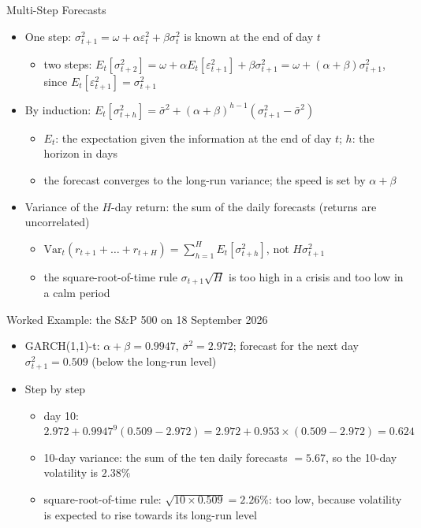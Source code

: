 \begin{frame}{Multi-Step Forecasts}
\itemsize{\small}
\begin{itemize}
    \item One step: $\sigma_{t+1}^2 = \omega + \alpha\varepsilon_t^2 + \beta\sigma_t^2$ is known at the end of day $t$
    \begin{itemize}
        \item two steps: $E_t[\sigma_{t+2}^2] = \omega + \alpha E_t[\varepsilon_{t+1}^2] + \beta\sigma_{t+1}^2 = \omega + (\alpha + \beta)\sigma_{t+1}^2$, since $E_t[\varepsilon_{t+1}^2] = \sigma_{t+1}^2$
    \end{itemize}
    \item By induction: $E_t[\sigma_{t+h}^2] = \bar\sigma^2 + (\alpha + \beta)^{h-1}(\sigma_{t+1}^2 - \bar\sigma^2)$
    \begin{itemize}
        \item $E_t$: the expectation given the information at the end of day $t$; $h$: the horizon in days
        \item the forecast converges to the long-run variance; the speed is set by $\alpha + \beta$
    \end{itemize}
    \item Variance of the $H$-day return: the sum of the daily forecasts (returns are uncorrelated)
    \begin{itemize}
        \item $\mathrm{Var}_t(r_{t+1} + \dots + r_{t+H}) = \sum_{h=1}^{H} E_t[\sigma_{t+h}^2]$, not $H\sigma_{t+1}^2$
        \item the square-root-of-time rule $\sigma_{t+1}\sqrt{H}$ is too high in a crisis and too low in a calm period
    \end{itemize}
\end{itemize}
\end{frame}

\begin{frame}{Worked Example: the S\&P 500 on 18 September 2026}
\itemsize{\small}
\begin{itemize}
    \item GARCH(1,1)-t: $\alpha + \beta = 0.9947$, $\bar\sigma^2 = 2.972$; forecast for the next day $\sigma_{t+1}^2 = 0.509$ (below the long-run level)
    \item Step by step
    \begin{itemize}
        \item day 10: $2.972 + 0.9947^{9}(0.509 - 2.972) = 2.972 + 0.953 \times (0.509 - 2.972) = 0.624$
        \item 10-day variance: the sum of the ten daily forecasts $= 5.67$, so the 10-day volatility is $2.38\%$
        \item square-root-of-time rule: $\sqrt{10 \times 0.509} = 2.26\%$: too low, because volatility is expected to rise towards its long-run level
    \end{itemize}
\end{itemize}
\end{frame}

